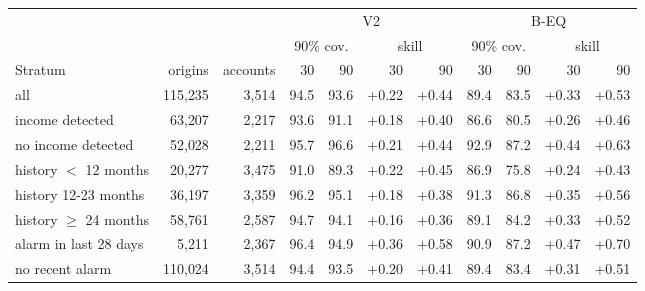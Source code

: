\begin{tabular}{lrr rrrr rrrr}
\toprule
 & & & \multicolumn{4}{c}{V2} & \multicolumn{4}{c}{B-EQ}\\
\cmidrule(lr){4-7}\cmidrule(lr){8-11}
 & & & \multicolumn{2}{c}{90\% cov.} & \multicolumn{2}{c}{skill} & \multicolumn{2}{c}{90\% cov.} & \multicolumn{2}{c}{skill}\\
Stratum & origins & accounts & 30 & 90 & 30 & 90 & 30 & 90 & 30 & 90\\
\midrule
all & 115{,}235 & 3{,}514 & 94.5 & 93.6 & +0.22 & +0.44 & 89.4 & 83.5 & +0.33 & +0.53 \\
income detected & 63{,}207 & 2{,}217 & 93.6 & 91.1 & +0.18 & +0.40 & 86.6 & 80.5 & +0.26 & +0.46 \\
no income detected & 52{,}028 & 2{,}211 & 95.7 & 96.6 & +0.21 & +0.44 & 92.9 & 87.2 & +0.44 & +0.63 \\
history $<$ 12 months & 20{,}277 & 3{,}475 & 91.0 & 89.3 & +0.22 & +0.45 & 86.9 & 75.8 & +0.24 & +0.43 \\
history 12-23 months & 36{,}197 & 3{,}359 & 96.2 & 95.1 & +0.18 & +0.38 & 91.3 & 86.8 & +0.35 & +0.56 \\
history $\geq$ 24 months & 58{,}761 & 2{,}587 & 94.7 & 94.1 & +0.16 & +0.36 & 89.1 & 84.2 & +0.33 & +0.52 \\
alarm in last 28 days & 5{,}211 & 2{,}367 & 96.4 & 94.9 & +0.36 & +0.58 & 90.9 & 87.2 & +0.47 & +0.70 \\
no recent alarm & 110{,}024 & 3{,}514 & 94.4 & 93.5 & +0.20 & +0.41 & 89.4 & 83.4 & +0.31 & +0.51 \\
\bottomrule
\end{tabular}
